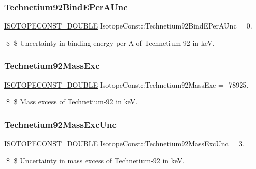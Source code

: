 \subsubsection{\texorpdfstring{Technetium92\+Bind\+E\+Per\+A\+Unc}{Technetium92BindEPerAUnc}}
{\footnotesize\ttfamily \mbox{\hyperlink{group___isotope_const-_macros_ga8f45a7272ce02c0b4c65c44636ed719a}{I\+S\+O\+T\+O\+P\+E\+C\+O\+N\+S\+T\+\_\+\+D\+O\+U\+B\+LE}} Isotope\+Const\+::\+Technetium92\+Bind\+E\+Per\+A\+Unc = 0.}

\$ \$ Uncertainty in binding energy per A of Technetium-\/92 in keV. \mbox{\label{group___isotope_const-_technetium-_tc92_ga5d8d7d18dbe449c4c15ddc3a777719ce}} 
\subsubsection{\texorpdfstring{Technetium92\+Mass\+Exc}{Technetium92MassExc}}
{\footnotesize\ttfamily \mbox{\hyperlink{group___isotope_const-_macros_ga8f45a7272ce02c0b4c65c44636ed719a}{I\+S\+O\+T\+O\+P\+E\+C\+O\+N\+S\+T\+\_\+\+D\+O\+U\+B\+LE}} Isotope\+Const\+::\+Technetium92\+Mass\+Exc = -\/78925.}

\$ \$ Mass excess of Technetium-\/92 in keV. \mbox{\label{group___isotope_const-_technetium-_tc92_gadca3965565d9852bf898d1983e94fdfb}} 
\subsubsection{\texorpdfstring{Technetium92\+Mass\+Exc\+Unc}{Technetium92MassExcUnc}}
{\footnotesize\ttfamily \mbox{\hyperlink{group___isotope_const-_macros_ga8f45a7272ce02c0b4c65c44636ed719a}{I\+S\+O\+T\+O\+P\+E\+C\+O\+N\+S\+T\+\_\+\+D\+O\+U\+B\+LE}} Isotope\+Const\+::\+Technetium92\+Mass\+Exc\+Unc = 3.}

\$ \$ Uncertainty in mass excess of Technetium-\/92 in keV. \mbox{\label{group___isotope_const-_technetium-_tc92_ga2b8da7657a382a0c2508af74567179a1}} 
